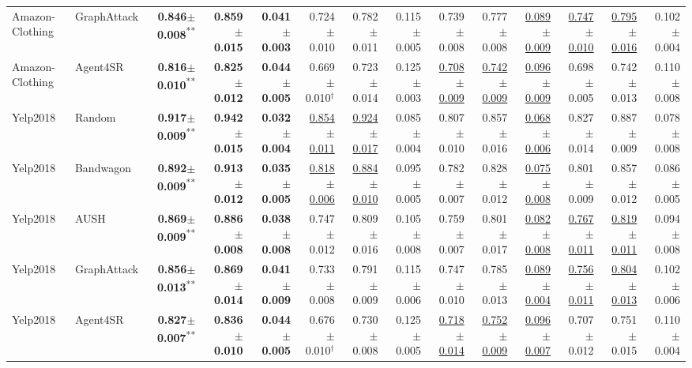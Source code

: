 \begin{table}[t]
\begin{tabular}{llrrrrrrrrrrrr}
Amazon-Clothing & GraphAttack & \textbf{0.846$\pm$0.008}\textsuperscript{**} & \textbf{0.859$\pm$0.015} & \textbf{0.041$\pm$0.003} & 0.724$\pm$0.010 & 0.782$\pm$0.011 & 0.115$\pm$0.005 & 0.739$\pm$0.008 & 0.777$\pm$0.008 & \underline{0.089$\pm$0.009} & \underline{0.747$\pm$0.010} & \underline{0.795$\pm$0.016} & 0.102$\pm$0.004 \\
Amazon-Clothing & Agent4SR & \textbf{0.816$\pm$0.010}\textsuperscript{**} & \textbf{0.825$\pm$0.012} & \textbf{0.044$\pm$0.005} & 0.669$\pm$0.010$^\dag$ & 0.723$\pm$0.014 & 0.125$\pm$0.003 & \underline{0.708$\pm$0.009} & \underline{0.742$\pm$0.009} & \underline{0.096$\pm$0.009} & 0.698$\pm$0.005 & 0.742$\pm$0.013 & 0.110$\pm$0.008 \\
\midrule
Yelp2018 & Random & \textbf{0.917$\pm$0.009}\textsuperscript{**} & \textbf{0.942$\pm$0.015} & \textbf{0.032$\pm$0.004} & \underline{0.854$\pm$0.011} & \underline{0.924$\pm$0.017} & 0.085$\pm$0.004 & 0.807$\pm$0.010 & 0.857$\pm$0.016 & \underline{0.068$\pm$0.006} & 0.827$\pm$0.014 & 0.887$\pm$0.009 & 0.078$\pm$0.008 \\
Yelp2018 & Bandwagon & \textbf{0.892$\pm$0.009}\textsuperscript{**} & \textbf{0.913$\pm$0.012} & \textbf{0.035$\pm$0.005} & \underline{0.818$\pm$0.006} & \underline{0.884$\pm$0.010} & 0.095$\pm$0.005 & 0.782$\pm$0.007 & 0.828$\pm$0.012 & \underline{0.075$\pm$0.008} & 0.801$\pm$0.009 & 0.857$\pm$0.012 & 0.086$\pm$0.005 \\
Yelp2018 & AUSH & \textbf{0.869$\pm$0.009}\textsuperscript{**} & \textbf{0.886$\pm$0.008} & \textbf{0.038$\pm$0.008} & 0.747$\pm$0.012 & 0.809$\pm$0.016 & 0.105$\pm$0.008 & 0.759$\pm$0.007 & 0.801$\pm$0.017 & \underline{0.082$\pm$0.008} & \underline{0.767$\pm$0.011} & \underline{0.819$\pm$0.011} & 0.094$\pm$0.008 \\
Yelp2018 & GraphAttack & \textbf{0.856$\pm$0.013}\textsuperscript{**} & \textbf{0.869$\pm$0.014} & \textbf{0.041$\pm$0.009} & 0.733$\pm$0.008 & 0.791$\pm$0.009 & 0.115$\pm$0.006 & 0.747$\pm$0.010 & 0.785$\pm$0.013 & \underline{0.089$\pm$0.004} & \underline{0.756$\pm$0.011} & \underline{0.804$\pm$0.013} & 0.102$\pm$0.006 \\
Yelp2018 & Agent4SR & \textbf{0.827$\pm$0.007}\textsuperscript{**} & \textbf{0.836$\pm$0.010} & \textbf{0.044$\pm$0.005} & 0.676$\pm$0.010$^\dag$ & 0.730$\pm$0.008 & 0.125$\pm$0.005 & \underline{0.718$\pm$0.014} & \underline{0.752$\pm$0.009} & \underline{0.096$\pm$0.007} & 0.707$\pm$0.012 & 0.751$\pm$0.015 & 0.110$\pm$0.004 \\
\bottomrule
\end{tabular}
\end{table}
